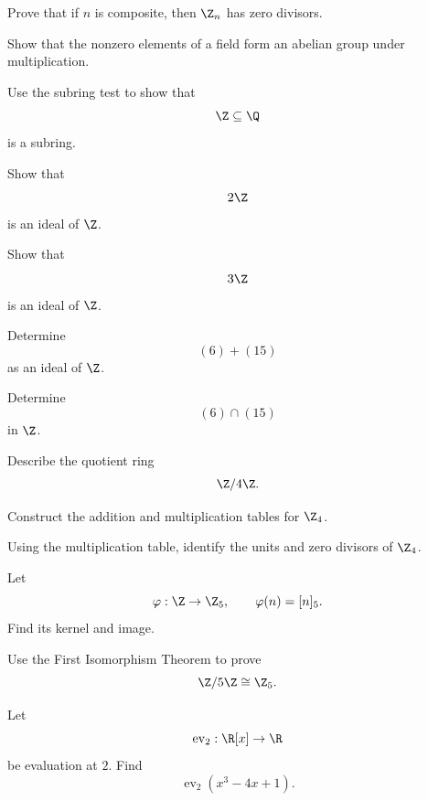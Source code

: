 \begin{exercise}[2]
Prove that if \(n\) is composite, then \(\Z_n\) has zero divisors.
\end{exercise}

\begin{exercise}[2]
Show that the nonzero elements of a field form an abelian group under
multiplication.
\end{exercise}

\begin{exercise}[2]
Use the subring test to show that
\[ \Z\subseteq\Q \]
is a subring.
\end{exercise}

\begin{exercise}[2]
Show that
\[ 2\Z \]
is an ideal of \(\Z\).
\end{exercise}

\begin{exercise}[2]
Show that
\[ 3\Z \]
is an ideal of \(\Z\).
\end{exercise}

\begin{exercise}[2]
Determine
\[ (6)+(15) \]
as an ideal of \(\Z\).
\end{exercise}

\begin{exercise}[2]
Determine
\[ (6)\cap(15) \]
in \(\Z\).
\end{exercise}

\begin{exercise}[2]
Describe the quotient ring
\[ \Z/4\Z. \]
\end{exercise}

\begin{exercise}[2]
Construct the addition and multiplication tables for \(\Z_4\).
\end{exercise}

\begin{exercise}[2]
Using the multiplication table, identify the units and zero divisors of
\(\Z_4\).
\end{exercise}

\begin{exercise}[2]
Let
\[ \varphi:\Z\to\Z_5,\qquad\varphi(n)=[n]_5. \]
Find its kernel and image.
\end{exercise}

\begin{exercise}[3]
Use the First Isomorphism Theorem to prove
\[ \Z/5\Z\cong\Z_5. \]
\end{exercise}

\begin{exercise}[2]
Let
\[ \operatorname{ev}_2:\R[x]\to\R \]
be evaluation at \(2\). Find
\[ \operatorname{ev}_2(x^3-4x+1). \]
\end{exercise}

